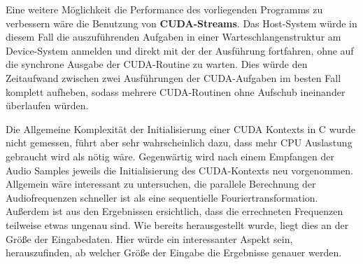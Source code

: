 Eine weitere Möglichkeit die Performance des vorliegenden Programms zu verbessern wäre die Benutzung von \textbf{CUDA-Streams}. Das Host-System würde in diesem Fall die auszuführenden Aufgaben in einer Warteschlangenstruktur am Device-System anmelden und direkt mit der der Ausführung fortfahren, ohne auf die synchrone Ausgabe der CUDA-Routine zu warten. Dies würde den Zeitaufwand zwischen zwei Ausführungen der CUDA-Aufgaben im besten Fall komplett aufheben, sodass mehrere CUDA-Routinen ohne Aufschub ineinander überlaufen würden.

Die Allgemeine Komplexität der Initialisierung einer CUDA Kontexts in C wurde nicht gemessen, führt aber sehr wahrscheinlich dazu, dass mehr CPU Auslastung gebraucht wird als nötig wäre. Gegenwärtig wird nach einem Empfangen der Audio Samples jeweils die Initialisierung des CUDA-Kontexts neu vorgenommen. Allgemein wäre interessant zu untersuchen, die parallele Berechnung der Audiofrequenzen schneller ist als eine sequentielle Fouriertransformation. Außerdem ist aus den Ergebnissen ersichtlich, dass die errechneten Frequenzen teilweise etwas ungenau sind. Wie bereits herausgestellt wurde, liegt dies an der Größe der Eingabedaten. Hier würde ein interessanter Aspekt sein, herauszufinden, ab welcher Größe der Eingabe die Ergebnisse genauer werden. 